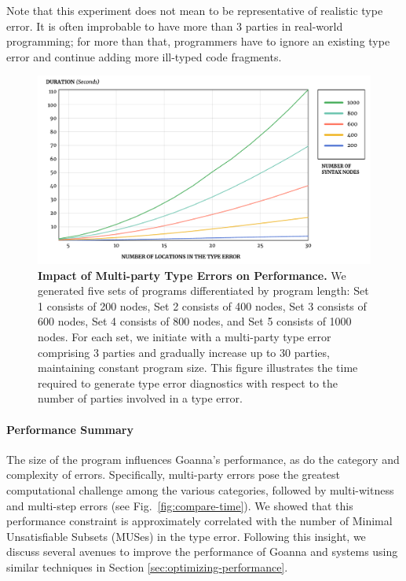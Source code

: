 \documentclass[pdflatex,lineno,sn-nature,Numbered]{sn-jnl}%
\begin{document}
Note that this experiment does not mean to be representative of realistic type error. It is often improbable to have more than 3 parties in real-world programming; for more than that, programmers have to ignore an existing type error and continue adding more ill-typed code fragments.


\begin{figure}[ht]
    \centering
    \includegraphics[width=\linewidth]{images/MultiPartyDuration}
    \caption{{\bf Impact of Multi-party Type Errors on Performance.} We generated five sets of programs differentiated by program length: Set 1 consists of 200 nodes, Set 2 consists of 400 nodes, Set 3 consists of 600 nodes, Set 4 consists of 800 nodes, and Set 5 consists of 1000 nodes. For each set, we initiate with a multi-party type error comprising 3 parties and gradually increase up to 30 parties, maintaining constant program size. This figure illustrates the time required to generate type error diagnostics with respect to the number of parties involved in a type error. }
    
    \label{fig:multi-party-time}
\end{figure}

\paragraph{Performance Summary}
The size of the program influences Goanna's performance, as do the category and complexity of errors. Specifically, multi-party errors pose the greatest computational challenge among the various categories, followed by multi-witness and multi-step errors (see Fig.~\ref{fig:compare-time}). We showed that this performance constraint is approximately correlated with the number of Minimal Unsatisfiable Subsets (MUSes) in the type error. Following this insight, we discuss several avenues to improve the performance of Goanna and systems using similar techniques in Section \ref{sec:optimizing-performance}.
\end{document}
